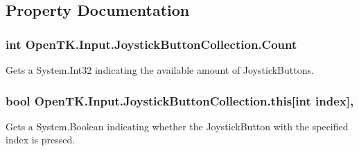 \subsection{Property Documentation}
\hypertarget{class_open_t_k_1_1_input_1_1_joystick_button_collection_a8641b79aefe0a1f1ec035bb123db0bec}{
\subsubsection[{Count}]{\setlength{\rightskip}{0pt plus 5cm}int Open\-T\-K.\-Input.\-Joystick\-Button\-Collection.\-Count\hspace{0.3cm}{\ttfamily [get]}}}\label{class_open_t_k_1_1_input_1_1_joystick_button_collection_a8641b79aefe0a1f1ec035bb123db0bec}


Gets a System.\-Int32 indicating the available amount of Joystick\-Buttons. 

\hypertarget{class_open_t_k_1_1_input_1_1_joystick_button_collection_a19f902624461596a5bbb4b976b9d8f61}{
\subsubsection[{this[int index]}]{\setlength{\rightskip}{0pt plus 5cm}bool Open\-T\-K.\-Input.\-Joystick\-Button\-Collection.\-this\mbox{[}int index\mbox{]}\hspace{0.3cm}{\ttfamily [get]}, {\ttfamily [set]}}}\label{class_open_t_k_1_1_input_1_1_joystick_button_collection_a19f902624461596a5bbb4b976b9d8f61}


Gets a System.\-Boolean indicating whether the Joystick\-Button with the specified index is pressed. 


